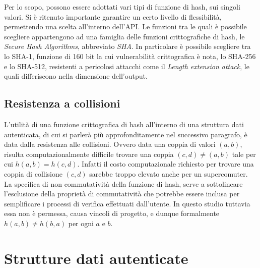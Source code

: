 			Per lo scopo, possono essere adottati vari tipi di funzione di hash, sui singoli valori. Si è ritenuto importante garantire un certo livello di flessibilità, permettendo una scelta all'interno dell'API. Le funzioni tra le quali è possibile scegliere appartengono ad una famiglia delle funzioni crittografiche di hash, le \textit{Secure Hash Algorithms}, abbreviato \textit{SHA}. In particolare è possibile scegliere tra lo SHA-1, funzione di 160 bit la cui vulnerabilità crittografica è nota, lo SHA-256 e lo SHA-512, resistenti a pericolosi attacchi come il \textit{Length extension attack}, le quali differiscono nella dimensione dell'output.
			
	\subsection{Resistenza a collisioni}
	

		L'utilità di una funzione crittografica di hash all'interno di una struttura dati autenticata, di cui si parlerà più approfonditamente nel successivo paragrafo, è data dalla resistenza alle collisioni. Ovvero data una coppia di valori $ (a,b) $, risulta computazionalmente difficile trovare una coppia $ (c,d) \ne (a,b) $ tale per cui  $ h(a,b) = h(c,d) $. Infatti il costo computazionale richiesto per trovare una coppia di collisione $ (c,d) $ sarebbe troppo elevato anche per un supercomuter. \\
		La specifica di non commutatività della funzione di hash, serve a sottolineare l'esclusione della proprietà di commutatività che potrebbe essere inclusa per semplificare i processi di verifica effettuati dall'utente.
		In questo studio tuttavia essa non è permessa, causa vincoli di progetto, e dunque formalmente $ h(a,b) \ne h(b,a) $ per ogni $ a $ e $ b $.

\section{Strutture dati autenticate}


